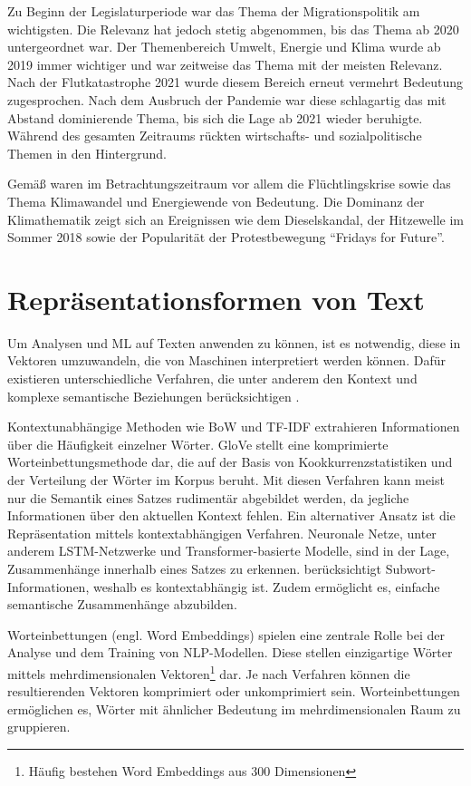Zu Beginn der Legislaturperiode war das Thema der Migrationspolitik am wichtigsten. Die Relevanz hat jedoch stetig abgenommen, bis das Thema ab \num{2020} untergeordnet war. Der Themenbereich Umwelt, Energie und Klima wurde ab \num{2019} immer wichtiger und war zeitweise das Thema mit der meisten Relevanz. Nach der Flutkatastrophe \num{2021} wurde diesem Bereich erneut vermehrt Bedeutung zugesprochen. Nach dem Ausbruch der Pandemie war diese schlagartig das mit Abstand dominierende Thema, bis sich die Lage ab \num{2021} wieder beruhigte. Während des gesamten Zeitraums rückten wirtschafts- und sozialpolitische Themen in den Hintergrund.

Gemäß \textcite{niedermayer_entwicklung_2020} waren im Betrachtungszeitraum vor allem die Flüchtlingskrise sowie das Thema Klimawandel und Energiewende von Bedeutung. Die Dominanz der Klimathematik zeigt sich an Ereignissen wie dem Dieselskandal, der Hitzewelle im Sommer \num{2018} sowie der Popularität der Protestbewegung \enquote{Fridays for Future}.

\section{Repräsentationsformen von Text} \label{sec:representationForms}

Um Analysen und \ac{ML} auf Texten anwenden zu können, ist es notwendig, diese in Vektoren umzuwandeln, die von Maschinen interpretiert werden können. Dafür existieren unterschiedliche Verfahren, die unter anderem den Kontext und komplexe semantische Beziehungen berücksichtigen \autocite{kowsari_text_2019, jurafsky_speech_2023}.

Kontextunabhängige Methoden wie \ac{BoW} und \ac{TF-IDF} extrahieren Informationen über die Häufigkeit einzelner Wörter. \ac{GloVe} stellt eine komprimierte Worteinbettungsmethode dar, die auf der Basis von Kookkurrenzstatistiken und der Verteilung der Wörter im Korpus beruht. Mit diesen Verfahren kann meist nur die Semantik eines Satzes rudimentär abgebildet werden, da jegliche Informationen über den aktuellen Kontext fehlen. Ein alternativer Ansatz ist die Repräsentation mittels kontextabhängigen Verfahren. Neuronale Netze, unter anderem \ac{LSTM}-Netzwerke und Transformer-basierte Modelle, sind in der Lage, Zusammenhänge innerhalb eines Satzes zu erkennen. \ft berücksichtigt Subwort-Informationen, weshalb es kontextabhängig ist. Zudem ermöglicht es, einfache semantische Zusammenhänge abzubilden.

Worteinbettungen (engl. Word Embeddings) spielen eine zentrale Rolle bei der Analyse und dem Training von \ac{NLP}-Modellen. Diese stellen einzigartige Wörter mittels mehrdimensionalen Vektoren\footnote{Häufig bestehen Word Embeddings aus \num{300} Dimensionen} dar. Je nach Verfahren können die resultierenden Vektoren komprimiert oder unkomprimiert sein. Worteinbettungen ermöglichen es, Wörter mit ähnlicher Bedeutung im mehrdimensionalen Raum zu gruppieren.

